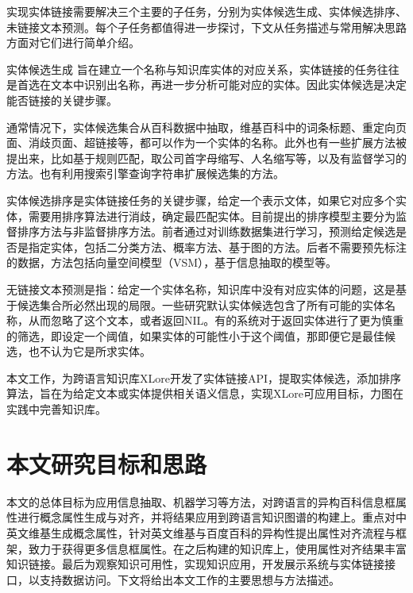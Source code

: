 实现实体链接需要解决三个主要的子任务，分别为实体候选生成、实体候选排序、未链接文本预测。每个子任务都值得进一步探讨，下文从任务描述与常用解决思路方面对它们进行简单介绍。

{\heiti 实体候选生成} 旨在建立一个名称与知识库实体的对应关系，实体链接的任务往往是首选在文本中识别出名称，再进一步分析可能对应的实体。因此实体候选是决定能否链接的关键步骤。

通常情况下，实体候选集合从百科数据中抽取\cite{bunescu2006using,shen2012linden,shen2013linking}，维基百科中的词条标题、重定向页面、消歧页面、超链接等，都可以作为一个实体的名称。此外也有一些扩展方法被提出来，比如基于规则匹配\cite{han2009nlpr_kbp,lehmann2010lcc}，取公司首字母缩写、人名缩写等，以及有监督学习的方法\cite{zhang2011entity}。也有利用搜索引擎查询字符串扩展候选集的方法\cite{dredze2010entity, monahan2011cross}。

{\heiti 实体候选排序}是实体链接任务的关键步骤，给定一个表示文体，如果它对应多个实体，需要用排序算法进行消歧，确定最匹配实体。目前提出的排序模型主要分为监督排序方法与非监督排序方法。前者通过对训练数据集进行学习，预测给定候选是否是指定实体，包括二分类方法\cite{zhang2010entity,lehmann2010lcc,monahan2011cross,chen2011collaborative}、概率方法\cite{han2011generative}、基于图的方法\cite{han2011collective}。后者不需要预先标注的数据，方法包括向量空间模型（VSM）\cite{cucerzan2007large,han2009nlpr_kbp}，基于信息抽取的模型\cite{varma2009iiit,gottipati2011linking}等。

{\heiti 无链接文本预测}是指：给定一个实体名称，知识库中没有对应实体的问题，这是基于候选集合所必然出现的局限。一些研究默认实体候选包含了所有可能的实体名称，从而忽略了这个文本\cite{cucerzan2007large,kulkarni2009collective,shen2012liege}，或者返回NIL\cite{varma2009iiit}。有的系统对于返回实体进行了更为慎重的筛选，即设定一个阈值，如果实体的可能性小于这个阈值，那即便它是最佳候选，也不认为它是所求实体\cite{han2009nlpr_kbp,lehmann2010lcc,han2011generative}。

本文工作，为跨语言知识库XLore开发了实体链接API，提取实体候选，添加排序算法，旨在为给定文本或实体提供相关语义信息，实现XLore可应用目标，力图在实践中完善知识库。

\section{本文研究目标和思路}
本文的总体目标为应用信息抽取、机器学习等方法，对跨语言的异构百科信息框属性进行概念属性生成与对齐，并将结果应用到跨语言知识图谱的构建上。重点对中英文维基生成概念属性，针对英文维基与百度百科的异构性提出属性对齐流程与框架，致力于获得更多信息框属性。在之后构建的知识库上，使用属性对齐结果丰富知识链接。最后为观察知识可用性，实现知识应用，开发展示系统与实体链接接口，以支持数据访问。下文将给出本文工作的主要思想与方法描述。

